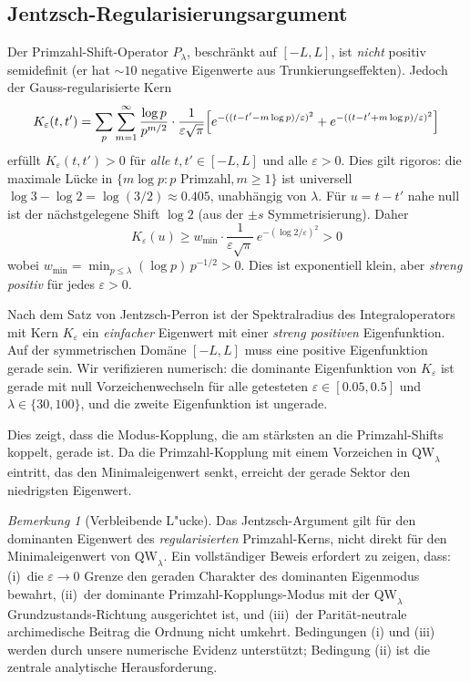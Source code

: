 \documentclass[12pt,a4paper]{article}
\theoremstyle{definition}
\theoremstyle{remark}
\newtheorem{remark}[theorem]{Bemerkung}
\begin{document}
\subsection{Jentzsch-Regularisierungsargument}

Der Primzahl-Shift-Operator $P_\lambda$, beschränkt auf $[-L,L]$, ist \emph{nicht} positiv semidefinit (er hat $\sim 10$ negative Eigenwerte aus Trunkierungseffekten). Jedoch der Gauss-regularisierte Kern
\[ K_\varepsilon(t,t') = \sum_p \sum_{m=1}^\infty \frac{\log p}{p^{m/2}} \cdot \frac{1}{\varepsilon\sqrt\pi} \Bigl[e^{-((t-t'-m\log p)/\varepsilon)^2} + e^{-((t-t'+m\log p)/\varepsilon)^2}\Bigr] \]
erfüllt $K_\varepsilon(t,t') > 0$ für \emph{alle} $t,t' \in [-L,L]$ und alle $\varepsilon > 0$. Dies gilt rigoros: die maximale Lücke in $\{m\log p : p\text{ Primzahl}, m \geq 1\}$ ist universell $\log 3 - \log 2 = \log(3/2) \approx 0.405$, unabhängig von $\lambda$. Für $u = t-t'$ nahe null ist der nächstgelegene Shift $\log 2$ (aus der $\pm s$ Symmetrisierung). Daher
\[ K_\varepsilon(u) \geq w_{\min} \cdot \frac{1}{\varepsilon\sqrt\pi}\, e^{-(\log 2/\varepsilon)^2} > 0 \]
wobei $w_{\min} = \min_{p \leq \lambda} (\log p)\, p^{-1/2} > 0$. Dies ist exponentiell klein, aber \emph{streng positiv} für jedes $\varepsilon > 0$.

Nach dem Satz von Jentzsch-Perron ist der Spektralradius des Integraloperators mit Kern $K_\varepsilon$ ein \emph{einfacher} Eigenwert mit einer \emph{streng positiven} Eigenfunktion. Auf der symmetrischen Domäne $[-L,L]$ muss eine positive Eigenfunktion gerade sein. Wir verifizieren numerisch: die dominante Eigenfunktion von $K_\varepsilon$ ist gerade mit null Vorzeichenwechseln für alle getesteten $\varepsilon \in [0.05, 0.5]$ und $\lambda \in \{30, 100\}$, und die zweite Eigenfunktion ist ungerade.

Dies zeigt, dass die Modus-Kopplung, die am stärksten an die Primzahl-Shifts koppelt, gerade ist. Da die Primzahl-Kopplung mit einem Vorzeichen in $\mathrm{QW}_\lambda$ eintritt, das den Minimaleigenwert senkt, erreicht der gerade Sektor den niedrigsten Eigenwert.

\begin{remark}[Verbleibende L"ucke]
Das Jentzsch-Argument gilt für den dominanten Eigenwert des \emph{regularisierten} Primzahl-Kerns, nicht direkt für den Minimaleigenwert von $\mathrm{QW}_\lambda$. Ein vollständiger Beweis erfordert zu zeigen, dass: (i)~die $\varepsilon \to 0$ Grenze den geraden Charakter des dominanten Eigenmodus bewahrt, (ii)~der dominante Primzahl-Kopplungs-Modus mit der $\mathrm{QW}_\lambda$ Grundzustands-Richtung ausgerichtet ist, und (iii)~der Parität-neutrale archimedische Beitrag die Ordnung nicht umkehrt. Bedingungen (i) und (iii) werden durch unsere numerische Evidenz unterstützt; Bedingung (ii) ist die zentrale analytische Herausforderung.
\end{remark}
\end{document}
